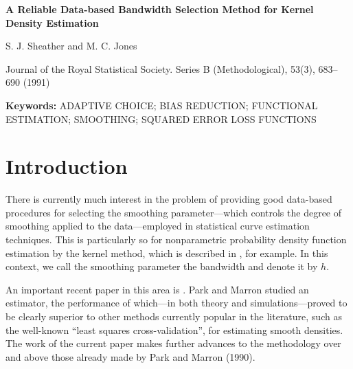 \documentclass[11pt]{article}
\begin{document}
\begin{center}
{\Large\bfseries A Reliable Data-based Bandwidth Selection Method for Kernel Density Estimation\par}
\vspace{0.5em}
{\large S. J. Sheather and M. C. Jones\par}
\vspace{0.4em}
Journal of the Royal Statistical Society. Series B (Methodological), 53(3), 683--690 (1991)
\end{center}

\begin{abstract}
We present a new method for data-based selection of the bandwidth in kernel density estimation which has excellent properties. It improves on a recent procedure of Park and Marron (which itself is a good method) in various ways. First, the new method has superior theoretical performance; second, it also has a computational advantage; third, the new method has reliably good performance for smooth densities in simulations, performance that is second to none in the existing literature. These methods are based on choosing the bandwidth to (approximately) minimize good quality estimates of the mean integrated squared error. The key to the success of the current procedure is the reintroduction of a non-stochastic term which was previously omitted together with use of the bandwidth to reduce bias in estimation without inflating variance.
\end{abstract}

\noindent\textbf{Keywords:} ADAPTIVE CHOICE; BIAS REDUCTION; FUNCTIONAL ESTIMATION; SMOOTHING; SQUARED ERROR LOSS FUNCTIONS

\section{Introduction}
There is currently much interest in the problem of providing good data-based procedures for selecting the smoothing parameter---which controls the degree of smoothing applied to the data---employed in statistical curve estimation techniques. This is particularly so for nonparametric probability density function estimation by the kernel method, which is described in \citet{silverman1986}, for example. In this context, we call the smoothing parameter the bandwidth and denote it by $h$.

An important recent paper in this area is \citet{parkmarron1990}. Park and Marron studied an estimator, the performance of which---in both theory and simulations---proved to be clearly superior to other methods currently popular in the literature, such as the well-known ``least squares cross-validation'', for estimating smooth densities. The work of the current paper makes further advances to the methodology over and above those already made by Park and Marron (1990).
\end{document}
